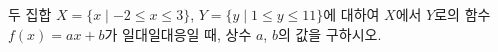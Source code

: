 두 집합 $X=\{x \mid -2\le x\le 3\}$, $Y=\{y \mid 1\le y\le 11\}$에 대하여 $X$에서 $Y$로의 함수 $f(x)=ax+b$가 일대일대응일 때, 상수 $a$, $b$의 값을 구하시오. 
